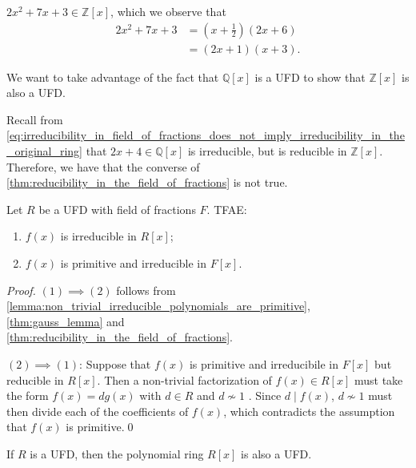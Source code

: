 \begin{eg}
  $2x^2 + 7x + 3 \in \mathbb{Z}[x]$, which we observe that
  \begin{align*}
    2x^2 + 7x + 3 &= \left(x + \frac{1}{2}\right)(2x + 6) \\
                  &= (2x + 1)(x + 3).
  \end{align*}
\end{eg}

We want to take advantage of the fact that $\mathbb{Q}[x]$ is a UFD to show that $\mathbb{Z}[x]$ is also a UFD.

Recall from \cref{eq:irreducibility_in_field_of_fractions_does_not_imply_irreducibility_in_the_original_ring} that $2x + 4 \in \mathbb{Q}[x]$ is irreducible, but is reducible in $\mathbb{Z}[x]$. Therefore, we have that the converse of \cref{thm:reducibility_in_the_field_of_fractions} is not true.

\begin{propo}
\label{propo:the_missing_condition_tying_irreducibility}
Let $R$ be a UFD with field of fractions $F$. TFAE:
\begin{enumerate}
  \item $f(x)$ is irreducible in $R[x]$;
  \item $f(x)$ is primitive and irreducible in $F[x]$.
\end{enumerate}
\end{propo}

\begin{proof}
  $(1) \implies (2)$ follows from \cref{lemma:non_trivial_irreducible_polynomials_are_primitive}, \cref{thm:gauss_lemma} and\\\noindent \cref{thm:reducibility_in_the_field_of_fractions}.

  \noindent $(2) \implies (1)$: Suppose that $f(x)$ is primitive and irreducibile in $F[x]$ but reducible in $R[x]$. Then a non-trivial factorization of $f(x) \in R[x]$ must take the form $f(x) = dg(x)$ with $d \in R$ and $d \not\sim 1$ . Since $d \mid f(x)$, $d \not\sim 1$ must then divide each of the coefficients of $f(x)$, which contradicts the assumption that $f(x)$ is primitive.\qed
\end{proof}

\begin{thm}
\label{thm:polynomial_ring_of_a_ufd_is_also_a_ufd}
  If $R$ is a UFD, then the polynomial ring $R[x]$ is also a UFD.
\end{thm}


